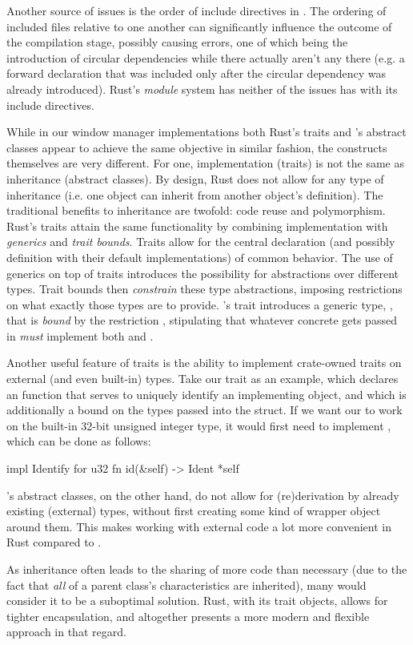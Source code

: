 Another source of issues is the order of include directives in \cpp. The
ordering of included files relative to one another can significantly influence
the outcome of the compilation stage, possibly causing errors, one of which
being the introduction of circular dependencies while there actually aren't any
there (e.g. a forward declaration that was included only after the circular
dependency was already introduced). Rust's \textit{module} system has neither of
the issues \cpp has with its include directives.

While in our window manager implementations both Rust's traits and \cpp's
abstract classes appear to achieve the same objective in similar fashion, the
constructs themselves are very different. For one, implementation (traits)
is not the same as inheritance (abstract classes). By design, Rust does not
allow for any type of inheritance (i.e. one object can inherit from another
object's definition). The traditional benefits to inheritance are twofold:
code reuse and polymorphism. Rust's traits attain the same functionality
by combining implementation with \textit{generics} and \textit{trait
bounds}\cite{therustbook, rustblogtraits}. Traits allow for the central
declaration (and possibly definition with their default implementations) of
common behavior\cite{therustbook, rustblogtraits}. The use of generics on
top of traits introduces the possibility for abstractions over different
types\cite{therustbook, rustblogtraits}. Trait bounds then \textit{constrain}
these type abstractions, imposing restrictions on what exactly those types
are to provide\cite{therustbook, rustblogtraits, therustreference}. \wmrs's
 trait introduces a generic type, , that is \textit{bound}
by the restriction , stipulating that whatever concrete
 gets passed in \textit{must} implement both  and
.

Another useful feature of traits is the ability to implement crate-owned
traits on external (and even built-in) types. Take our  trait
as an example, which declares an  function that serves to uniquely
identify an implementing object, and which is additionally a bound on the types
passed into the  struct. If we want our  to work on
the built-in 32-bit unsigned integer type, it would first need to implement
, which can be done as follows:

\begin{rustblock}
  impl Identify for u32 {
    fn id(&self) -> Ident {
      *self
    }
  }
\end{rustblock}

\cpp's abstract classes, on the other hand, do not allow for (re)derivation by
already existing (external) types, without first creating some kind of wrapper
object around them. This makes working with external code a lot more convenient
in Rust compared to \cpp.

As inheritance often leads to the sharing of more code than necessary (due to
the fact that \textit{all} of a parent class's characteristics are inherited),
many would consider it to be a suboptimal solution. Rust, with its trait
objects, allows for tighter encapsulation, and altogether presents a more modern
and flexible approach in that regard.

